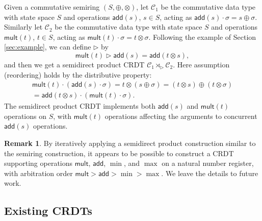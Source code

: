 \documentclass[acmsmall,nonacm]{acmart}
\newcommand{\mc}[1]{\ensuremath{\mathcal{#1}}}
\newcommand{\msf}[1]{\ensuremath{\mathsf{#1}}}
\newcommand{\act}{\triangleright}
\theoremstyle{plain}
\theoremstyle{definition}
\newtheorem{myrmk}[mythm]{Remark}
\begin{document}
Given a commutative semiring $(S, \oplus, \otimes)$, let $\mc{C}_1$ be the commutative data type with state space $S$ and operations $\msf{add}(s)$, $s \in S$, acting as $\msf{add}(s) \cdot \sigma = s \oplus \sigma$.  Similarly let $\mc{C}_2$ be the commutative data type with state space $S$ and operations $\msf{mult}(t)$, $t \in S$, acting as $\msf{mult}(t) \cdot \sigma = t \otimes \sigma$.  Following the example of Section \ref{sec:example}, we can define $\act$ by
\[
\msf{mult}(t) \act \msf{add}(s) = \msf{add}(t \otimes s),
\]
and then we get a semidirect product CRDT $\mc{C}_1 \rtimes_\act \mc{C}_2$.  Here assumption (reordering) holds by the distributive property:
\begin{align*}
\msf{mult}(t) \cdot (\msf{add}(s) \cdot \sigma) = t \otimes (s \oplus \sigma) = (t \otimes s) \oplus (t \otimes \sigma) \\ = \msf{add}(t \otimes s) \cdot (\msf{mult}(t) \cdot \sigma).
\end{align*}
The semidirect product CRDT implements both $\msf{add}(s)$ and $\msf{mult}(t)$ operations on $S$, with $\msf{mult}(t)$ operations affecting the arguments to concurrent $\msf{add}(s)$ operations.

\begin{myrmk}
By iteratively applying a semidirect product construction similar to the semiring construction, it appears to be possible to construct a CRDT supporting operations $\msf{mult}$, $\msf{add}$, $\min$, and $\max$ on a natural number register, with arbitration order $\msf{mult} > \msf{add} > \min > \max$.  We leave the details to future work.
\end{myrmk}



\subsection{Existing CRDTs}
\end{document}
